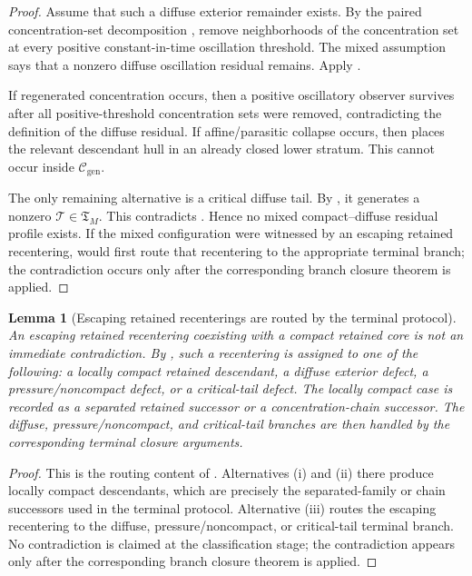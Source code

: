 \documentclass[11pt]{amsart}
\numberwithin{equation}{section}
\theoremstyle{plain}
\newtheorem{lemma}[lemma]{Lemma}
\theoremstyle{definition}
\theoremstyle{remark}
\newcommand{\Cgen}{\mathcal C_{\mathrm{gen}}}
\newcommand{\Tcrit}{\mathfrak T_M}
\begin{document}
\begin{proof}
Assume that such a diffuse exterior remainder exists.  By the paired
concentration-set decomposition , remove
neighborhoods of the concentration set at every positive constant-in-time oscillation
threshold.  The mixed assumption says that a nonzero diffuse oscillation
residual remains.  Apply .

If regenerated concentration occurs, then a positive oscillatory observer
survives after all positive-threshold concentration sets were removed, contradicting
the definition of the diffuse residual.  If affine/parasitic collapse occurs,
then  places
the relevant descendant hull in an already closed lower stratum.  This cannot
occur inside \(\Cgen\).

The only remaining alternative is a critical diffuse tail.  By
, it generates a nonzero
\(\mathcal T\in\Tcrit\).  This contradicts
.  Hence no mixed compact--diffuse residual
profile exists.  If the mixed configuration were witnessed by an escaping
retained recentering,  would
first route that recentering to the appropriate terminal branch; the
contradiction occurs only after the corresponding branch closure theorem is
applied.
\end{proof}

\begin{lemma}[Escaping retained recenterings are routed by the terminal protocol]
\label{lem:escaping-retained-recentering-routing}
An escaping retained recentering coexisting with a compact retained core is not
an immediate contradiction.  By
, such a recentering is assigned to
one of the following: a locally compact retained descendant, a diffuse exterior
defect, a pressure/noncompact defect, or a critical-tail defect.  The locally
compact case is recorded as a separated retained successor or a
concentration-chain successor.  The diffuse, pressure/noncompact, and
critical-tail branches are then handled by the corresponding terminal closure
arguments.
\end{lemma}

\begin{proof}
This is the routing content of
.  Alternatives \textup{(i)} and
\textup{(ii)} there produce locally compact descendants, which are precisely the
separated-family or chain successors used in the terminal protocol.  Alternative
\textup{(iii)} routes the escaping recentering to the diffuse,
pressure/noncompact, or critical-tail terminal branch.  No contradiction is
claimed at the classification stage; the contradiction appears only after the
corresponding branch closure theorem is applied.
\end{proof}
\end{document}

